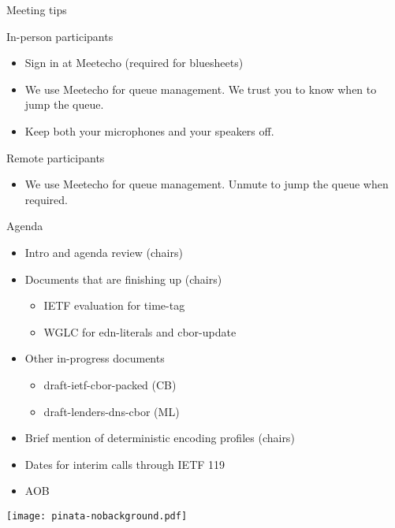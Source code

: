 \documentclass[aspectratio=169]{beamer}
\begin{document}
\begin{frame}{Meeting tips}
    \begin{block}{\small In-person participants}
      \begin{itemize}
        \item Sign in at Meetecho (required for bluesheets)
        \item We use Meetecho for queue management. We trust you to know when to jump the queue.
        \item Keep both your microphones and your speakers off.
      \end{itemize}
    \end{block}

    \begin{block}{\small Remote participants}
      \begin{itemize}
        \item We use Meetecho for queue management. Unmute to jump the queue when required.
      \end{itemize}
    \end{block}
\end{frame}

\begin{frame}{Agenda}\large
    \begin{itemize}
        \item Intro and agenda review (chairs)
        \item Documents that are finishing up (chairs)
            \begin{itemize}
                \item IETF evaluation for time-tag
                \item WGLC for edn-literals and cbor-update
            \end{itemize}
        \item Other in-progress documents
            \begin{itemize}
                \item draft-ietf-cbor-packed (CB)
                \item draft-lenders-dns-cbor (ML)
            \end{itemize}
        \item Brief mention of deterministic encoding profiles (chairs)

        \item Dates for interim calls through IETF 119
        \item AOB
    \end{itemize}

    \vspace{-3cm}
    \begin{block}{\texttt{[image: pinata-nobackground.pdf]}\mbox{\quad}}
    \end{block}
\end{frame}
\end{document}
